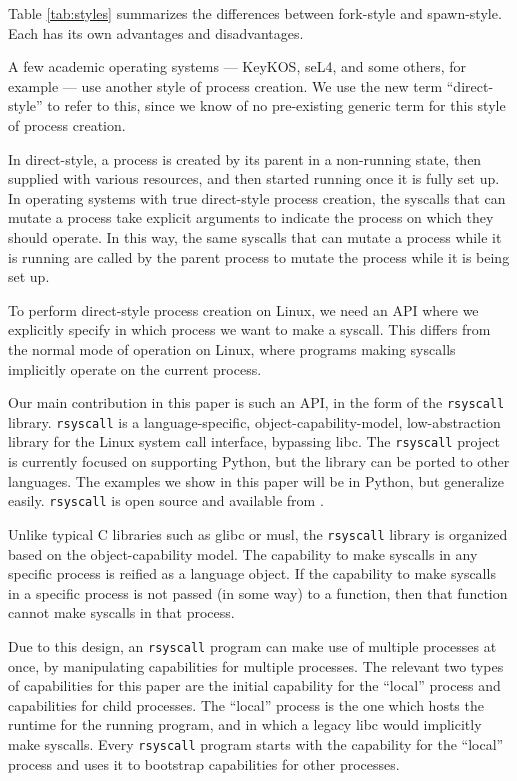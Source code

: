 \documentclass[letterpaper,twocolumn,10pt]{article}
\begin{document}
Table \ref{tab:styles} summarizes the differences between fork-style and spawn-style.
Each has its own advantages and disadvantages.

A few academic operating systems --- KeyKOS, seL4, and some others, for example ---
use another style of process creation.\cite{keykos}\cite{sel4}\cite{exokernel}\cite{fuchsia}\cite{singularity}
We use the new term ``direct-style'' to refer to this,
since we know of no pre-existing generic term for this style of process creation.

In direct-style, a process is created by its parent in a non-running state,
then supplied with various resources,
and then started running once it is fully set up.
In operating systems with true direct-style process creation,
the syscalls that can mutate a process
take explicit arguments to indicate the process on which they should operate.\cite{keykos}\cite{sel4}
In this way, the same syscalls that can mutate a process while it is running
are called by the parent process to mutate the process while it is being set up.

To perform direct-style process creation on Linux,
we need an API where we explicitly specify in which process we want to make a syscall.
This differs from the normal mode of operation on Linux,
where programs making syscalls implicitly operate on the current process.

Our main contribution in this paper is such an API, in the form of the \texttt{rsyscall} library.
\texttt{rsyscall} is a
language-specific, object-capability-model, low-abstraction library for the Linux system call interface,
bypassing libc.\cite{capmyths}\cite{robust_composition}
The \texttt{rsyscall} project is currently focused on supporting Python,
but the library can be ported to other languages.
The examples we show in this paper will be in Python,
but generalize easily.
\texttt{rsyscall} is open source and available from
\githuburl{}.

Unlike typical C libraries such as glibc or musl,
the \texttt{rsyscall} library is organized based on the object-capability model.\cite{capmyths}
The capability to make syscalls in any specific process is reified as a language object.
If the capability to make syscalls in a specific process is not passed (in some way) to a function,
then that function cannot make syscalls in that process.

Due to this design, an \texttt{rsyscall} program can make use of multiple processes at once,
by manipulating capabilities for multiple processes.
The relevant two types of capabilities for this paper are the initial capability for the ``local'' process
and capabilities for child processes.
The ``local'' process is the one which hosts the runtime for the running program,
and in which a legacy libc would implicitly make syscalls.
Every \texttt{rsyscall} program starts with the capability for the ``local'' process
and uses it to bootstrap capabilities for other processes.
\end{document}
